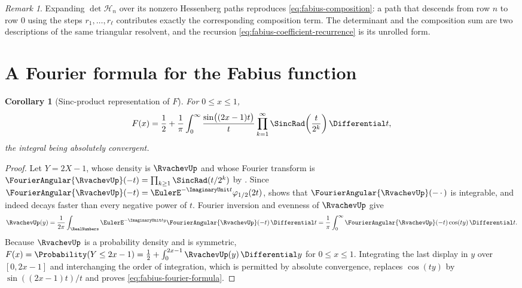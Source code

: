 \documentclass[11pt,a4paper,oneside,openany]{book}
\newtheorem{corollary}[corollary]{Corollary}
\theoremstyle{definition}
\theoremstyle{remark}
\newtheorem{remark}[remark]{Remark}
\begin{document}
\begin{remark}
Expanding $\det\mathcal H_n$ over its nonzero Hessenberg paths reproduces
\eqref{eq:fabius-composition}: a path that descends from row $n$ to row $0$ using the
steps $r_1,\ldots,r_\ell$ contributes exactly the corresponding composition term.  The
determinant and the composition sum are two descriptions of the same triangular
resolvent, and the recursion \eqref{eq:fabius-coefficient-recurrence} is its unrolled form.
\end{remark}

\section{A Fourier formula for the Fabius function}

\begin{corollary}[Sinc-product representation of $F$]\label{cor:fabius-fourier-formula}
For $0\le x\le1$,
\begin{equation}\label{eq:fabius-fourier-formula}
 F(x)=\frac12
 +\frac1\pi\int_0^{\infty}
 \frac{\sin\bigl((2x-1)t\bigr)}{t}
 \prod_{k=1}^{\infty}\SincRad\!\left(\frac t{2^k}\right)\Differential t,
\end{equation}
the integral being absolutely convergent.
\end{corollary}

\begin{proof}
Let $Y=2X-1$, whose density is $\RvachevUp$ and whose Fourier transform is
$\FourierAngular{\RvachevUp}(-t)=\prod_{k\ge1}\SincRad(t/2^k)$ by
.  Since $\FourierAngular{\RvachevUp}(-t)=\EulerE^{-\ImaginaryUnit t}\varphi_{1/2}(2t)$,
 shows that
$\FourierAngular{\RvachevUp}(-\,\cdot\,)$ is integrable, and indeed decays faster than every
negative power of $t$.  Fourier inversion and evenness of $\RvachevUp$ give
\[
\RvachevUp(y)=\frac1{2\pi}\int_{\RealNumbers}\EulerE^{-\ImaginaryUnit ty}\FourierAngular{\RvachevUp}(-t)\,\Differential t
=\frac1\pi\int_0^{\infty}\FourierAngular{\RvachevUp}(-t)\cos(ty)\,\Differential t .
\]
Because $\RvachevUp$ is a probability density and is symmetric,
$F(x)=\Probability(Y\le2x-1)=\tfrac12+\int_0^{2x-1}\RvachevUp(y)\,\Differential y$ for
$0\le x\le1$.  Integrating the last display in $y$ over $[0,2x-1]$ and interchanging the
order of integration, which is permitted by absolute convergence, replaces
$\cos(ty)$ by $\sin((2x-1)t)/t$ and proves \eqref{eq:fabius-fourier-formula}.
\end{proof}
\end{document}
